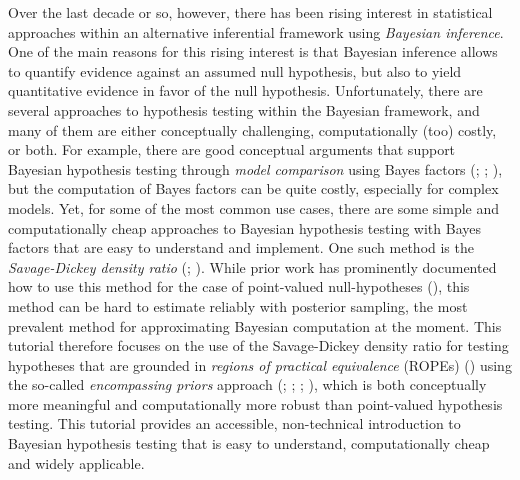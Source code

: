 \documentclass[
  doc,
  floatsintext,
  longtable,
  nolmodern,
  notxfonts,
  notimes,
  colorlinks=true,linkcolor=blue,citecolor=blue,urlcolor=blue]{apa7}
\begin{document}
Over the last decade or so, however, there has been rising interest in
statistical approaches within an alternative inferential framework using
\emph{Bayesian inference}. One of the main reasons for this rising
interest is that Bayesian inference allows to quantify evidence against
an assumed null hypothesis, but also to yield quantitative evidence in
favor of the null hypothesis. Unfortunately, there are several
approaches to hypothesis testing within the Bayesian framework, and many
of them are either conceptually challenging, computationally (too)
costly, or both. For example, there are good conceptual arguments that
support Bayesian hypothesis testing through \emph{model comparison}
using Bayes factors (; ;
), but the computation of Bayes factors can be quite
costly, especially for complex models. Yet, for some of the most common
use cases, there are some simple and computationally cheap approaches to
Bayesian hypothesis testing with Bayes factors that are easy to
understand and implement. One such method is the \emph{Savage-Dickey
density ratio} (;
). While prior work has prominently documented how to use this
method for the case of point-valued null-hypotheses
(), this method can be hard to estimate reliably with posterior
sampling, the most prevalent method for approximating Bayesian
computation at the moment. This tutorial therefore focuses on the use of
the Savage-Dickey density ratio for testing hypotheses that are grounded
in \emph{regions of practical equivalence} (ROPEs)
()
using the so-called \emph{encompassing priors} approach
(;
; ;
), which is both conceptually more meaningful and computationally
more robust than point-valued hypothesis testing. This tutorial provides
an accessible, non-technical introduction to Bayesian hypothesis testing
that is easy to understand, computationally cheap and widely applicable.
\end{document}
